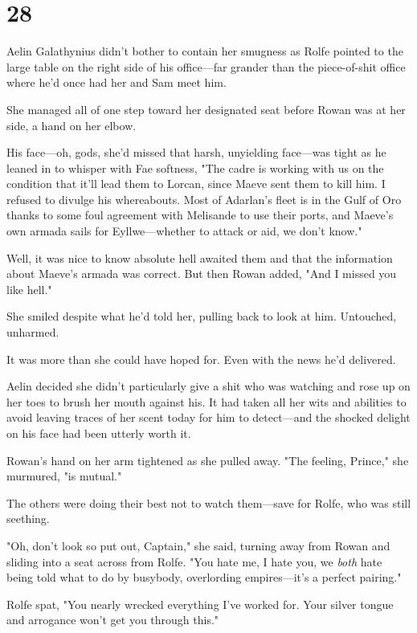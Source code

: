 
\chapter{28}

Aelin Galathynius didn't bother to contain her smugness as Rolfe pointed to the large table on the right side of his office---far grander than the piece-of-shit office where he'd once had her and Sam meet him.

She managed all of one step toward her designated seat before Rowan was at her side, a hand on her elbow.

His face---oh, gods, she'd missed that harsh, unyielding face---was tight as he leaned in to whisper with Fae softness, "The cadre is working with us on the condition that it'll lead them to Lorcan, since Maeve sent them to kill him.
I refused to divulge his whereabouts.
Most of Adarlan's fleet is in the Gulf of Oro thanks to some foul agreement with Melisande to use their ports, and Maeve's own armada sails for Eyllwe---whether to attack or aid, we don't know."

Well, it was nice to know absolute hell awaited them and that the information about Maeve's armada was correct.
But then Rowan added, "And I missed you like hell."

She smiled despite what he'd told her, pulling back to look at him.
Untouched, unharmed.

It was more than she could have hoped for.
Even with the news he'd delivered.

Aelin decided she didn't particularly give a shit who was watching and rose up on her toes to brush her mouth against his.
It had taken all her wits and abilities to avoid leaving traces of her scent today for him to detect---and the shocked delight on his face had been utterly worth it.

Rowan's hand on her arm tightened as she pulled away.
"The feeling, Prince," she murmured, "is mutual."

The others were doing their best not to watch them---save for Rolfe, who was still seething.

"Oh, don't look so put out, Captain," she said, turning away from Rowan and sliding into a seat across from Rolfe.
"You hate me, I hate you, we \emph{both} hate being told what to do by busybody, overlording empires---it's a perfect pairing."

Rolfe spat, "You nearly wrecked everything I've worked for.
Your silver tongue and arrogance won't get you through this."

